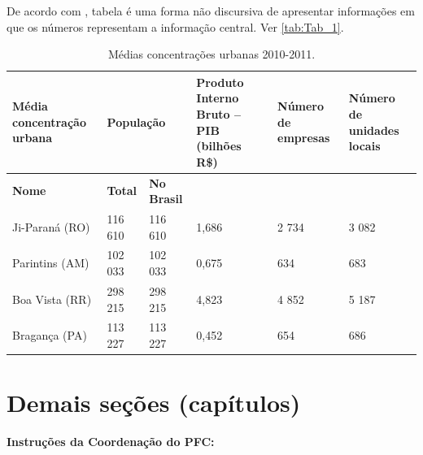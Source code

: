 
De acordo com \textcite{ibge1993}, tabela é uma forma não discursiva de apresentar informações em que os números representam a informação central. Ver \autoref{tab:Tab_1}.

\begin{table}[htb]
	\ABNTEXfontereduzida
	\caption{\label{tab:Tab_1}Médias concentrações urbanas 2010-2011.}
	\begin{tabular}{@{}p{3.0cm}p{1.5cm}p{2cm}p{2.5cm}p{2.5cm}p{2.5cm}@{}}
		\toprule
		\textbf{Média concentração urbana} & \multicolumn{2}{l}{\textbf{População}} & \textbf{Produto Interno Bruto – PIB (bilhões R\$)} & \textbf{Número de empresas} & \textbf{Número de unidades locais} \\ \midrule
		\textbf{Nome}                      & \textbf{Total}   & \textbf{No Brasil}  &                                                   &                             & \\
		Ji-Paraná (RO)                     & 116 610          & 116 610             & 1,686                                             & 2 734                       & 3 082 \\
		Parintins (AM)                     & 102 033          & 102 033             & 0,675                                             & 634                         & 683 \\
		Boa Vista (RR)                     & 298 215          & 298 215             & 4,823                                             & 4 852                       & 5 187 \\
		Bragança (PA)                      & 113 227          & 113 227             & 0,452                                             & 654                         & 686 \\ \bottomrule
	\end{tabular}
\end{table}

\chapter{Demais seções (capítulos)}

\textbf{Instruções da Coordenação do PFC:}

